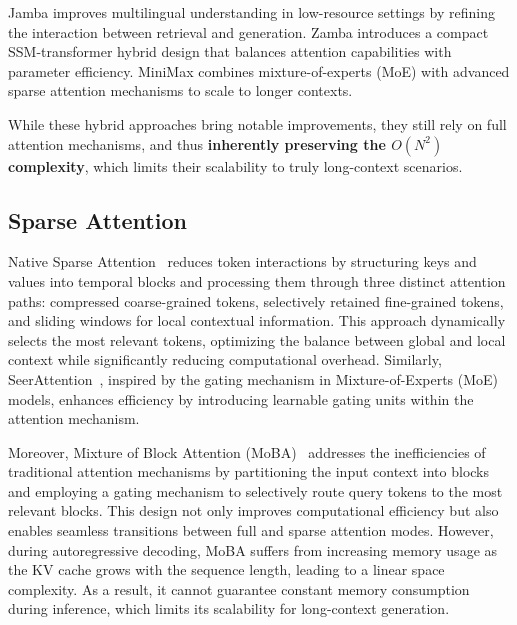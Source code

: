 Jamba improves multilingual understanding in low-resource settings by refining the interaction between retrieval and generation. Zamba introduces a compact SSM-transformer hybrid design that balances attention capabilities with parameter efficiency. MiniMax combines mixture-of-experts (MoE) with advanced sparse attention mechanisms to scale to longer contexts.

While these hybrid approaches bring notable improvements, they still rely on full attention mechanisms, and thus \textbf{inherently preserving the $O(N^2)$ complexity}, which limits their scalability to truly long-context scenarios.

\subsection{Sparse Attention}
Native Sparse Attention~\cite{yuan2025nativesparseattentionhardwarealigned} reduces token interactions by structuring keys and values into temporal blocks and processing them through three distinct attention paths: compressed coarse-grained tokens, selectively retained fine-grained tokens, and sliding windows for local contextual information. This approach dynamically selects the most relevant tokens, optimizing the balance between global and local context while significantly reducing computational overhead.
Similarly, SeerAttention~\cite{gao2025seerattentionlearningintrinsicsparse}, inspired by the gating mechanism in Mixture-of-Experts (MoE) models, enhances efficiency by introducing learnable gating units within the attention mechanism.

Moreover, Mixture of Block Attention (MoBA)~\cite{lu2025mobamixtureblockattention} addresses the inefficiencies of traditional attention mechanisms by partitioning the input context into blocks and employing a gating mechanism to selectively route query tokens to the most relevant blocks. This design not only improves computational efficiency but also enables seamless transitions between full and sparse attention modes.
However, during autoregressive decoding, MoBA suffers from increasing memory usage as the KV cache grows with the sequence length, leading to a linear space complexity. As a result, it cannot guarantee constant memory consumption during inference, which limits its scalability for long-context generation.

